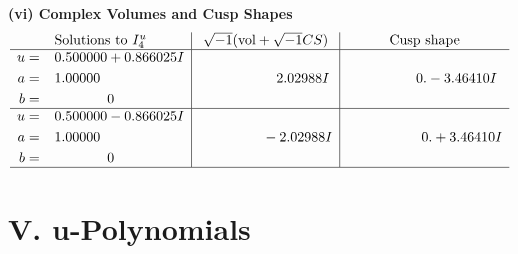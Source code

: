 \documentclass[1p]{elsarticle_modified}
\theoremstyle{definition}
\newcommand{\I}{\sqrt{-1}}
\begin{document}
\newpage\flushleft \textbf{(vi) Complex Volumes and Cusp Shapes}
$$\begin{array}{c|c|c}  
\text{Solutions to }I^u_{4}& \I (\text{vol} + \sqrt{-1}CS) & \text{Cusp shape}\\
 \hline 
\begin{aligned}
u &= \phantom{-}0.500000 + 0.866025 I \\
a &= \phantom{-}1.00000\phantom{ +0.000000I} \\
b &= \phantom{-0.000000 } 0\end{aligned}
 & \phantom{-0.000000 -}2.02988 I & \phantom{-0.000000 } 0. - 3.46410 I \\ \hline\begin{aligned}
u &= \phantom{-}0.500000 - 0.866025 I \\
a &= \phantom{-}1.00000\phantom{ +0.000000I} \\
b &= \phantom{-0.000000 } 0\end{aligned}
 & \phantom{-0.000000 } -2.02988 I & \phantom{-0.000000 -}0. + 3.46410 I\\
 \hline 
 \end{array}$$\newpage
\newpage\renewcommand{\arraystretch}{1}
\centering \section*{ V. u-Polynomials}
\end{document}
